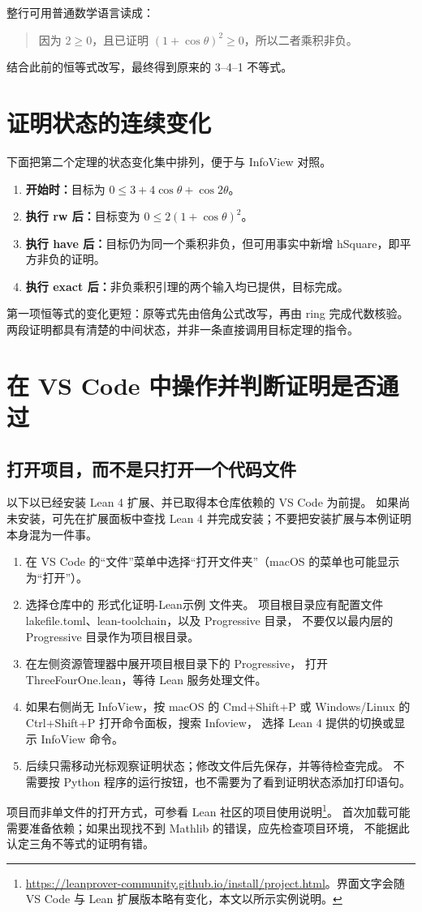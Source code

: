 \documentclass[UTF8,fontset=fandol,a4paper,11pt]{ctexart}
\newcommand{\code}[1]{{\small\ttfamily\def\_{\textunderscore\allowbreak}#1}}
\newcommand{\step}[1]{\Needspace{7\baselineskip}\subsection{#1}}
\begin{document}
整行可用普通数学语言读成：
\begin{quote}
因为 $2\ge0$，且已证明 $(1+\cos\theta)^2\ge0$，所以二者乘积非负。
\end{quote}
结合此前的恒等式改写，最终得到原来的 3–4–1 不等式。

\section{证明状态的连续变化}

下面把第二个定理的状态变化集中排列，便于与 InfoView 对照。
\begin{enumerate}
  \item \textbf{开始时：}目标为 $0\le3+4\cos\theta+\cos2\theta$。
  \item \textbf{执行 \code{rw} 后：}目标变为 $0\le2(1+\cos\theta)^2$。
  \item \textbf{执行 \code{have} 后：}目标仍为同一个乘积非负，但可用事实中新增
    \code{hSquare}，即平方非负的证明。
  \item \textbf{执行 \code{exact} 后：}非负乘积引理的两个输入均已提供，目标完成。
\end{enumerate}
第一项恒等式的变化更短：原等式先由倍角公式改写，再由 \code{ring} 完成代数核验。
两段证明都具有清楚的中间状态，并非一条直接调用目标定理的指令。

\section{在 VS Code 中操作并判断证明是否通过}

\step{打开项目，而不是只打开一个代码文件}
以下以已经安装 Lean 4 扩展、并已取得本仓库依赖的 VS Code 为前提。
如果尚未安装，可先在扩展面板中查找 Lean 4 并完成安装；不要把安装扩展与本例证明本身混为一件事。
\begin{enumerate}
  \item 在 VS Code 的“文件”菜单中选择“打开文件夹”（macOS 的菜单也可能显示为“打开”）。
  \item 选择仓库中的 \code{形式化证明-Lean示例} 文件夹。
    项目根目录应有配置文件 \code{lakefile.toml}、\code{lean-toolchain}，以及 \code{Progressive} 目录，
    不要仅以最内层的 \code{Progressive} 目录作为项目根目录。
  \item 在左侧资源管理器中展开项目根目录下的 \code{Progressive}，
    打开 \code{ThreeFourOne.lean}，等待 Lean 服务处理文件。
  \item 如果右侧尚无 InfoView，按 macOS 的 \code{Cmd+Shift+P} 或
    Windows/Linux 的 \code{Ctrl+Shift+P} 打开命令面板，搜索 \code{Infoview}，
    选择 Lean 4 提供的切换或显示 InfoView 命令。
  \item 后续只需移动光标观察证明状态；修改文件后先保存，并等待检查完成。
    不需要按 Python 程序的运行按钮，也不需要为了看到证明状态添加打印语句。
\end{enumerate}
项目而非单文件的打开方式，可参看 Lean 社区的项目使用说明\footnote{\url{https://leanprover-community.github.io/install/project.html}。界面文字会随 VS Code 与 Lean 扩展版本略有变化，本文以所示实例说明。}。
首次加载可能需要准备依赖；如果出现找不到 \code{Mathlib} 的错误，应先检查项目环境，
不能据此认定三角不等式的证明有错。
\end{document}
